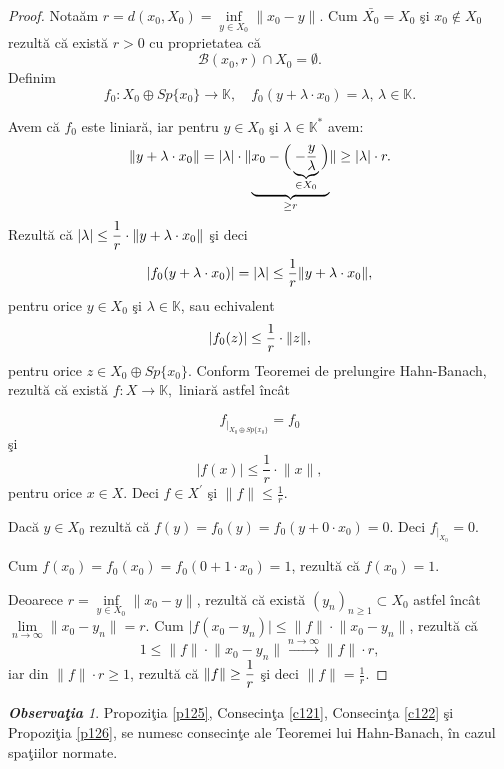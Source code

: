 \documentclass[ a4paper, 12pt]{report}
\theoremstyle{definition}
\theoremstyle{remark}
\newtheorem{obs}{\bf Observa\c tia }[section]
\numberwithin{equation}{section}
\begin{document}
\begin{proof}
Nota\u am $r = d(x_0,X_0) = \inf\limits_{y \in X_0} \lVert x_0 - y \rVert$. Cum $\bar{X_0} = X_0$ \c si $x_0 \notin X_0$ rezult\u a c\u a exist\u a $r>0$ cu proprietatea c\u a
$$\mathcal{B}(x_0,r) \cap X_0 = \emptyset.$$
Definim
$$f_0 : X_0 \oplus Sp\{x_0\} \rightarrow \mathbb{K},\quad  f_0(y + \lambda \cdot x_0) = \lambda, \, \lambda \in \mathbb{K}.$$

Avem c\u a $f_0$ este liniar\u a, iar pentru $y \in X_0$ \c si $\lambda \in \mathbb{K}^{\ast}$ avem:
$$\lVert  y + \lambda \cdot x_0 \rVert = \lvert \lambda \rvert \cdot \lVert \underbrace{ x_0 - \Big(\underbrace{-\displaystyle\frac{y}{\lambda}}_{\in X_0}\Big)}_{\geq r} \rVert \geq \lvert \lambda \rvert \cdot r.$$
Rezult\u a c\u a $\lvert \lambda \rvert \leq \displaystyle\frac{1}{r} \cdot \lVert y+\lambda \cdot x_0 \rVert$ \c si deci
$$\lvert f_0(y + \lambda \cdot x_0) \rvert = \lvert \lambda \rvert \leq \displaystyle\frac{1}{r}\lVert y + \lambda \cdot x_0  \rVert,$$ pentru orice $y \in X_0$ \c si $\lambda \in \mathbb{K}$, sau echivalent  $$\lvert f_0(z) \rvert \leq \displaystyle\frac{1}{r} \cdot \lVert z \rVert,$$ pentru orice $z \in X_0 \oplus Sp\{x_0\}$. Conform Teoremei de prelungire Hahn-Banach, rezult\u a c\u a exist\u a  $f : X \rightarrow \mathbb{K},$ liniar\u a astfel \^inc\^at

$$f_{|_{X_0 \oplus Sp\{ x_0 \}}} = f_0$$ \c si
$$\lvert f(x) \rvert \leq \frac{1}{r} \cdot \lVert x \rVert,$$ pentru orice $x \in X$. Deci $f \in X^{'}$ \c si $\lVert f  \rVert \leq \frac{1}{r}$.

Dac\u a $y \in X_0$ rezult\u a c\u a $f(y) = f_0(y) = f_0(y + 0 \cdot x_0) = 0$. Deci $f_{|_{X_0}} = 0$.

Cum $f(x_0) = f_0(x_0) = f_0(0 + 1 \cdot x_0) = 1$, rezult\u a  c\u a $f(x_0) = 1$.

Deoarece $r = \inf\limits_{y \in X_0} \lVert x_0 - y  \rVert$, rezult\u a c\u a exist\u a $(y_n)_{n \geq 1} \subset X_0$ astfel \^inc\^at $\lim\limits_{n \to \infty}\lVert x_0 - y_n \rVert = r$. Cum  $\lvert f(x_0 - y_n)  \rvert \leq \lVert f  \rVert \cdot \lVert x_0 - y_n \rVert$, rezult\u a c\u a
$$1 \leq \lVert f \rVert \cdot \lVert x_0 - y_n \rVert \stackrel{n \rightarrow \infty}{\longrightarrow} \lVert f  \rVert \cdot r,$$ iar din $\lVert f \rVert \cdot r \geq 1$, rezult\u a c\u a $\lVert f \rVert \geq \displaystyle\frac{1}{r}$ \c si deci $\lVert f \rVert = \frac{1}{r}$.
\end{proof}

\begin{obs}
Propozi\c tia \ref{p125}, Consecin\c ta \ref{c121}, Consecin\c ta \ref{c122} \c si Propozi\c tia \ref{p126}, se numesc consecin\c te ale Teoremei lui Hahn-Banach, \^in cazul spa\c tiilor normate.
\end{obs}
\end{document}
